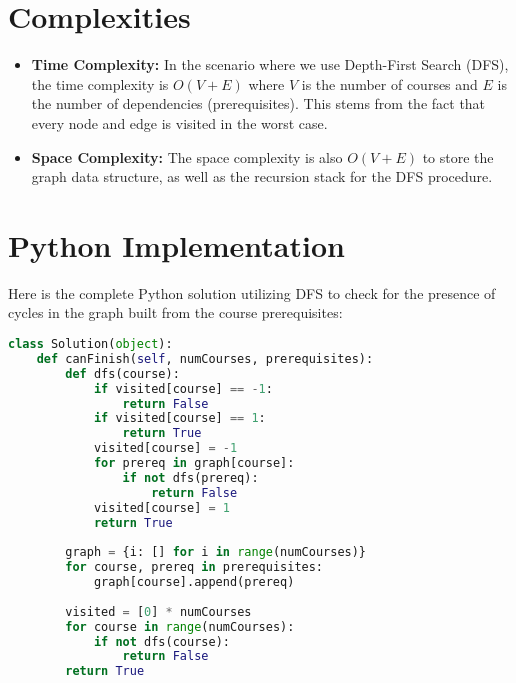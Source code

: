 \section*{Complexities}

\begin{itemize}
    \item \textbf{Time Complexity:} In the scenario where we use Depth-First Search (DFS), the time complexity is \(O(V + E)\) where \( V \) is the number of courses and \( E \) is the number of dependencies (prerequisites). This stems from the fact that every node and edge is visited in the worst case.
    \item \textbf{Space Complexity:} The space complexity is also \(O(V + E)\) to store the graph data structure, as well as the recursion stack for the DFS procedure.
\end{itemize}

\newpage %
\section*{Python Implementation}


Here is the complete Python solution utilizing DFS to check for the presence of cycles in the graph built from the course prerequisites:

\begin{fullwidth}
\begin{lstlisting}[language=Python]
class Solution(object):
    def canFinish(self, numCourses, prerequisites):
        def dfs(course):
            if visited[course] == -1:
                return False
            if visited[course] == 1:
                return True
            visited[course] = -1
            for prereq in graph[course]:
                if not dfs(prereq):
                    return False
            visited[course] = 1
            return True
        
        graph = {i: [] for i in range(numCourses)}
        for course, prereq in prerequisites:
            graph[course].append(prereq)
        
        visited = [0] * numCourses
        for course in range(numCourses):
            if not dfs(course):
                return False
        return True
\end{lstlisting}
\end{fullwidth}

